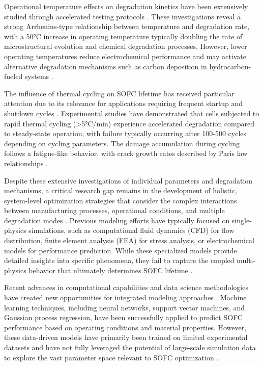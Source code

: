 \documentclass[conference]{IEEEtran}
\begin{document}
Operational temperature effects on degradation kinetics have been extensively studied through accelerated testing protocols \cite{mcphail2024accelerated}. These investigations reveal a strong Arrhenius-type relationship between temperature and degradation rate, with a 50°C increase in operating temperature typically doubling the rate of microstructural evolution and chemical degradation processes. However, lower operating temperatures reduce electrochemical performance and may activate alternative degradation mechanisms such as carbon deposition in hydrocarbon-fueled systems \cite{weber2024temperature}.

The influence of thermal cycling on SOFC lifetime has received particular attention due to its relevance for applications requiring frequent startup and shutdown cycles \cite{hatae2024cycling}. Experimental studies have demonstrated that cells subjected to rapid thermal cycling (>5°C/min) experience accelerated degradation compared to steady-state operation, with failure typically occurring after 100-500 cycles depending on cycling parameters. The damage accumulation during cycling follows a fatigue-like behavior, with crack growth rates described by Paris law relationships \cite{radovic2024fatigue}.

Despite these extensive investigations of individual parameters and degradation mechanisms, a critical research gap remains in the development of holistic, system-level optimization strategies that consider the complex interactions between manufacturing processes, operational conditions, and multiple degradation modes \cite{virkar2024system}. Previous modeling efforts have typically focused on single-physics simulations, such as computational fluid dynamics (CFD) for flow distribution, finite element analysis (FEA) for stress analysis, or electrochemical models for performance prediction. While these specialized models provide detailed insights into specific phenomena, they fail to capture the coupled multi-physics behavior that ultimately determines SOFC lifetime \cite{andersson2024multiphysics}.

Recent advances in computational capabilities and data science methodologies have created new opportunities for integrated modeling approaches \cite{ryan2024machine}. Machine learning techniques, including neural networks, support vector machines, and Gaussian process regression, have been successfully applied to predict SOFC performance based on operating conditions and material properties. However, these data-driven models have primarily been trained on limited experimental datasets and have not fully leveraged the potential of large-scale simulation data to explore the vast parameter space relevant to SOFC optimization \cite{subotic2024artificial}.
\end{document}

